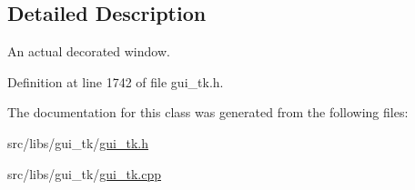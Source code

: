 \subsection{Detailed Description}
An actual decorated window. 

Definition at line 1742 of file gui\-\_\-tk.\-h.



The documentation for this class was generated from the following files\-:\begin{DoxyCompactItemize}
\item 
src/libs/gui\-\_\-tk/\hyperlink{gui__tk_8h}{gui\-\_\-tk.\-h}\item 
src/libs/gui\-\_\-tk/\hyperlink{gui__tk_8cpp}{gui\-\_\-tk.\-cpp}\end{DoxyCompactItemize}
